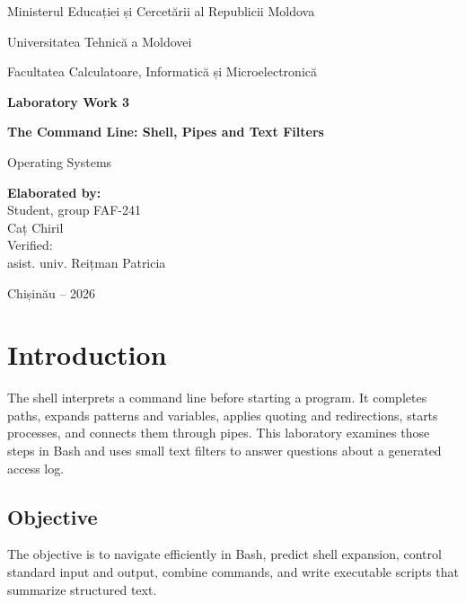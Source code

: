 \documentclass[12pt]{article}
\begin{document}
\begin{titlepage}
\centering
{\large Ministerul Educației și Cercetării al Republicii Moldova\par}
\vspace{0.45cm}
{\large Universitatea Tehnică a Moldovei\par}
\vspace{0.45cm}
{\large Facultatea Calculatoare, Informatică și Microelectronică\par}
\vspace{3cm}
{\Large\bfseries Laboratory Work 3\par}
\vspace{0.55cm}
{\LARGE\bfseries The Command Line: Shell, Pipes and Text Filters\par}
\vspace{0.35cm}
{\large Operating Systems\par}
\vfill
\begin{flushleft}
\textbf{Elaborated by:}\\
Student, group FAF-241\\
Caț Chiril\\
\vspace{1cm}
Verified:\\
asist. univ. Reițman Patricia
\end{flushleft}
\vfill
{Chișinău -- 2026\par}
\end{titlepage}

\tableofcontents
\clearpage
{}

\section*{Introduction}
The shell interprets a command line before starting a program. It completes paths, expands patterns and variables, applies quoting and redirections, starts processes, and connects them through pipes. This laboratory examines those steps in Bash and uses small text filters to answer questions about a generated access log.

\subsection*{Objective}
The objective is to navigate efficiently in Bash, predict shell expansion, control standard input and output, combine commands, and write executable scripts that summarize structured text.
\end{document}
